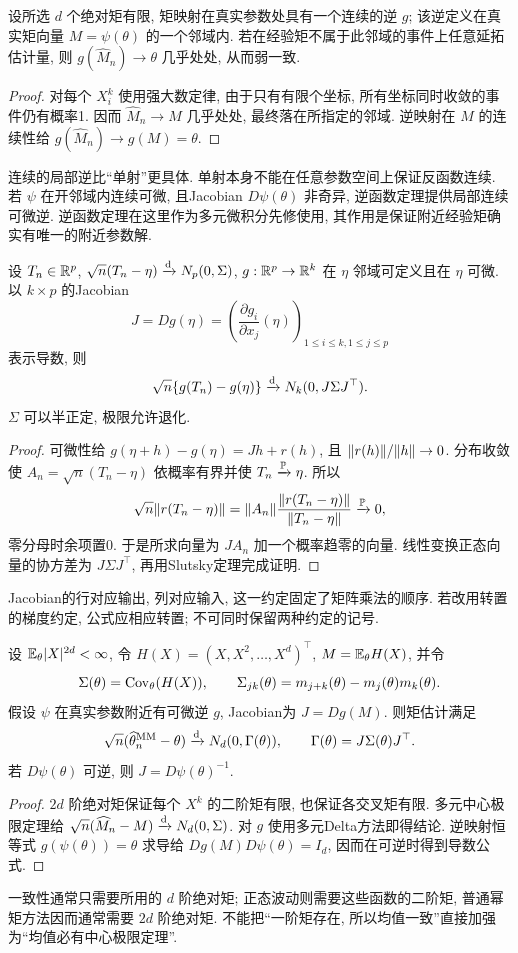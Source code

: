\begin{proposition}[矩估计的一致性]
设所选 $d$ 个绝对矩有限, 矩映射在真实参数处具有一个连续的逆 $g$; 该逆定义在真实矩向量 $M=\psi(\theta)$ 的一个邻域内. 若在经验矩不属于此邻域的事件上任意延拓估计量, 则 $g(\widehat M_n)\to\theta$ 几乎处处, 从而弱一致.
\end{proposition}
\begin{proof}
对每个 $X_i^k$ 使用强大数定律, 由于只有有限个坐标, 所有坐标同时收敛的事件仍有概率1. 因而 $\widehat M_n\to M$ 几乎处处, 最终落在所指定的邻域. 逆映射在 $M$ 的连续性给 $g(\widehat M_n)\to g(M)=\theta$.
\end{proof}
连续的局部逆比“单射”更具体. 单射本身不能在任意参数空间上保证反函数连续. 若 $\psi$ 在开邻域内连续可微, 且Jacobian $D\psi(\theta)$ 非奇异, 逆函数定理提供局部连续可微逆. 逆函数定理在这里作为多元微积分先修使用, 其作用是保证附近经验矩确实有唯一的附近参数解.

\begin{theorem}[多元Delta方法]
设 $T_n\in\mathbb R^p$, $\sqrt n(T_n-\eta)\xrightarrow{\mathrm d} N_p(0,\Sigma)$, $g:\mathbb R^p\to\mathbb R^k$ 在 $\eta$ 邻域可定义且在 $\eta$ 可微. 以 $k\times p$ 的Jacobian
\[
 J=Dg(\eta)=\left(\frac{\partial g_i}{\partial x_j}(\eta)\right)_{1\le i\le k,1\le j\le p}
\]
表示导数, 则
\[
 \sqrt n\{g(T_n)-g(\eta)\}\xrightarrow{\mathrm d} N_k(0,J\Sigma J^\top).
\]
$\Sigma$ 可以半正定, 极限允许退化.
\end{theorem}
\begin{proof}
可微性给 $g(\eta+h)-g(\eta)=Jh+r(h)$, 且 $\lVert r(h)\rVert/\lVert h\rVert\to0$. 分布收敛使 $A_n=\sqrt n(T_n-\eta)$ 依概率有界并使 $T_n\xrightarrow{\mathbb P}\eta$. 所以
\[
 \sqrt n\lVert r(T_n-\eta)\rVert
 =\lVert A_n\rVert\frac{\lVert r(T_n-\eta)\rVert}{\lVert T_n-\eta\rVert}\xrightarrow{\mathbb P}0,
\]
零分母时余项置0. 于是所求向量为 $JA_n$ 加一个概率趋零的向量. 线性变换正态向量的协方差为 $J\Sigma J^\top$, 再用Slutsky定理完成证明.
\end{proof}
Jacobian的行对应输出, 列对应输入, 这一约定固定了矩阵乘法的顺序. 若改用转置的梯度约定, 公式应相应转置; 不可同时保留两种约定的记号.

\begin{theorem}[矩估计的渐近分布]
设 $\mathbb E_\theta|X|^{2d}<\infty$, 令 $H(X)=(X,X^2,\ldots,X^d)^\top$, $M=\mathbb E_\theta H(X)$, 并令
\[
 \Sigma(\theta)=\operatorname{Cov}_\theta(H(X)),\qquad
 \Sigma_{jk}(\theta)=m_{j+k}(\theta)-m_j(\theta)m_k(\theta).
\]
假设 $\psi$ 在真实参数附近有可微逆 $g$, Jacobian为 $J=Dg(M)$. 则矩估计满足
\[
 \sqrt n(\widehat\theta_n^{\mathrm{MM}}-\theta)\xrightarrow{\mathrm d}
 N_d(0,\Gamma(\theta)),\qquad
 \Gamma(\theta)=J\Sigma(\theta)J^\top.
\]
若 $D\psi(\theta)$ 可逆, 则 $J=D\psi(\theta)^{-1}$.
\end{theorem}
\begin{proof}
$2d$ 阶绝对矩保证每个 $X^k$ 的二阶矩有限, 也保证各交叉矩有限. 多元中心极限定理给
$\sqrt n(\widehat M_n-M)\xrightarrow{\mathrm d} N_d(0,\Sigma)$.
对 $g$ 使用多元Delta方法即得结论. 逆映射恒等式 $g(\psi(\theta))=\theta$ 求导给 $Dg(M)D\psi(\theta)=I_d$, 因而在可逆时得到导数公式.
\end{proof}
一致性通常只需要所用的 $d$ 阶绝对矩; 正态波动则需要这些函数的二阶矩, 普通幂矩方法因而通常需要 $2d$ 阶绝对矩. 不能把“一阶矩存在, 所以均值一致”直接加强为“均值必有中心极限定理”.

